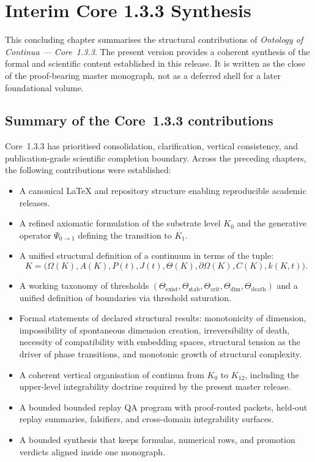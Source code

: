 
\section{Interim Core 1.3.3 Synthesis}
\label{sec:conclusion}

This concluding chapter summarises the structural contributions of
\emph{Ontology of Continua --- Core~1.3.3}. The present version provides a
coherent synthesis of the formal and scientific content established in this
release. It is written as the close of the proof-bearing master monograph,
not as a deferred shell for a later foundational volume.

\subsection{Summary of the Core~1.3.3 contributions}

Core~1.3.3 has prioritised consolidation, clarification, vertical consistency,
and publication-grade scientific completion boundary.
Across the preceding chapters, the following contributions were established:

\begin{itemize}
    \item A canonical \LaTeX{} and repository structure enabling reproducible academic releases.
    \item A refined axiomatic formulation of the substrate level \(K_0\) and the generative operator 
          \(\Psi_{0\to 1}\) defining the transition to \(K_1\).
    \item A unified structural definition of a continuum in terms of the tuple:
          \[
              K = \big(\Omega(K), A(K), P(t), J(t), \Theta(K), \partial\Omega(K), C(K), k(K,t)\big).
          \]
    \item A working taxonomy of thresholds 
          \((\Theta_{\mathrm{exist}}, \Theta_{\mathrm{stab}}, \Theta_{\mathrm{crit}}, 
            \Theta_{\mathrm{dim}}, \Theta_{\mathrm{death}})\) 
          and a unified definition of boundaries via threshold saturation.
    \item Formal statements of declared structural results:
          monotonicity of dimension,
          impossibility of spontaneous dimension creation,
          irreversibility of death,
          necessity of compatibility with embedding spaces,
          structural tension as the driver of phase transitions,
          and monotonic growth of structural complexity.
    \item A coherent vertical organisation of continua from \(K_0\) to \(K_{12}\),  
          including the upper-level integrability doctrine required by the present master release.
    \item A bounded bounded replay QA program with proof-routed packets, held-out replay summaries, falsifiers, and cross-domain integrability surfaces.
    \item A bounded synthesis that keeps formulas, numerical rows, and promotion verdicts aligned inside one monograph.
\end{itemize}

